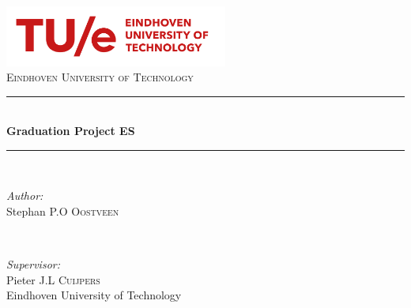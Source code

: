 \begin{titlepage}

\newcommand{\HRule}{\rule{\linewidth}{0.5mm}} %

\center %
 
\includegraphics[width=0.55\textwidth]{images/tuelogonew.png}\\[0.7cm]
\textsc{\LARGE Eindhoven University of Technology}\\[2.5cm] %


\HRule \\[0.4cm]
{ \huge \bfseries Graduation Project ES}\\[0.4cm] %

\HRule \\[2cm]
 

\begin{minipage}[t]{0.5\textwidth}
\begin{flushleft} \large
\emph{Author:}\\
Stephan P.O \textsc{Oostveen}\\
\end{flushleft}
\end{minipage}
~
\begin{minipage}[t]{0.45\textwidth}
\begin{flushright} \large
\emph{Supervisor:} \\ 
Pieter J.L \textsc{Cuijpers}\\  %
Eindhoven University of Technology
\end{flushright}
\end{minipage}\\[4cm]


\end{titlepage}
